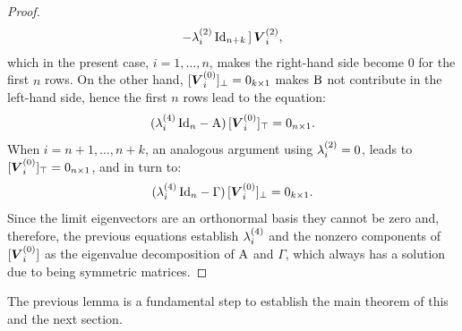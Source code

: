 \documentclass[letterpaper, reqno, 11pt]{amsart}
\theoremstyle{definition}
\theoremstyle{remark}
\numberwithin{equation}{section}
\begin{document}
\begin{proof}
\begin{align*}
	-\lambda^{(2)}_i\,\mathrm{Id}_{n+k}\, ]\,\boldsymbol{V}^{(2)}_i,
\end{align*}
which in the present case, $i=1,\dots,n$, makes the right-hand side become $0$ for the first $n$ rows. On the other hand, $[\boldsymbol{V}^{(0)}_i]_\perp=0_{k\times 1}$ makes $\mathrm{B}$ not contribute in the left-hand side, hence the first $n$ rows lead to the equation:
$$
(\lambda^{(4)}_i\,\mathrm{Id}_n -\mathrm{A})\,[\boldsymbol{V}^{(0)}_i]_\top = 0_{n\times 1}.
$$
When $i=n+1,\dots,n+k$, an analogous argument using $\lambda^{(2)}_i=0$, leads to $[\boldsymbol{V}^{(0)}_i]_\top=0_{n\times 1}$, and in turn to:
$$
(\lambda^{(4)}_i\,\mathrm{Id}_n -\Gamma)\,[\boldsymbol{V}^{(0)}_i]_\perp = 0_{k\times 1}.
$$
Since the limit eigenvectors are an orthonormal basis they cannot be zero and, therefore, the previous equations establish $\lambda^{(4)}_i$ and the nonzero components of $[\boldsymbol{V}^{(0)}_i]$ as the eigenvalue decomposition of $\mathrm{A}$ and $\Gamma$, which always has a solution due to being symmetric matrices.
\end{proof}

The previous lemma is a fundamental step to establish the main theorem of this and the next section.
\end{document}
